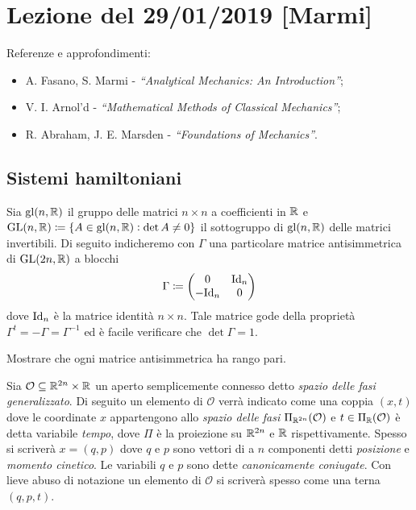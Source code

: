 \section{Lezione del 29/01/2019 [Marmi]}
Referenze e approfondimenti:
\begin{itemize}
    \item A. Fasano, S. Marmi - \emph{``Analytical Mechanics: An Introduction''};
    \item V. I. Arnol'd - \emph{``Mathematical Methods of Classical Mechanics''};
    \item R. Abraham, J. E. Marsden - \emph{``Foundations of Mechanics''}.
\end{itemize}

\subsection{Sistemi hamiltoniani}
Sia $ \mathrm{gl}(n, \mathbb{R}) $ il gruppo delle matrici $ n \times n $ a coefficienti in $ \mathbb{R} $ e $ {\mathrm{GL}(n, \mathbb{R}) \coloneqq \{A \in \mathrm{gl}(n, \mathbb{R}) : \det{A} \neq 0\}} $ il sottogruppo di $ \mathrm{gl}(n, \mathbb{R}) $ delle matrici invertibili. Di seguito indicheremo con $ \Gamma $ una particolare matrice antisimmetrica di $ \mathrm{GL}(2n, \mathbb{R}) $ a blocchi
\begin{equation}
    \Gamma \coloneqq
    \begin{pmatrix}
        0 & \mathrm{Id}_{n} \\
        -\mathrm{Id}_{n} & 0 \\
    \end{pmatrix}
\end{equation}
dove $ \mathrm{Id}_n $ è la matrice identità $ n \times n $. Tale matrice gode della proprietà $ \Gamma^t = -\Gamma = \Gamma^{-1} $ ed è facile verificare che $ \det{\Gamma} = 1 $. \\

\begin{exercise}
    Mostrare che ogni matrice antisimmetrica ha rango pari.
\end{exercise}

Sia $ \mathcal{O} \subseteq \mathbb{R}^{2n} \times \mathbb{R} $ un aperto semplicemente connesso detto \emph{spazio delle fasi generalizzato}. Di seguito un elemento di $ \mathcal{O} $ verrà indicato come una coppia $ (x, t) $ dove le coordinate $ x $ appartengono allo \emph{spazio delle fasi} $ \Pi_{\mathbb{R}^{2n}}(\mathcal{O}) $ e $ t \in \Pi_{\mathbb{R}}(\mathcal{O}) $ è detta variabile \emph{tempo}, dove $ \Pi $ è la proiezione su $ \mathbb{R}^{2n} $ e $ \mathbb{R} $ rispettivamente. Spesso si scriverà $ x = (q, p) $ dove $ q $ e $ p $ sono vettori di a $ n $ componenti detti \emph{posizione} e \emph{momento cinetico}. Le variabili $ q $ e $ p $ sono dette \emph{canonicamente coniugate}. Con lieve abuso di notazione un elemento di $ \mathcal{O} $ si scriverà spesso come una terna $ (q, p, t) $. \\

